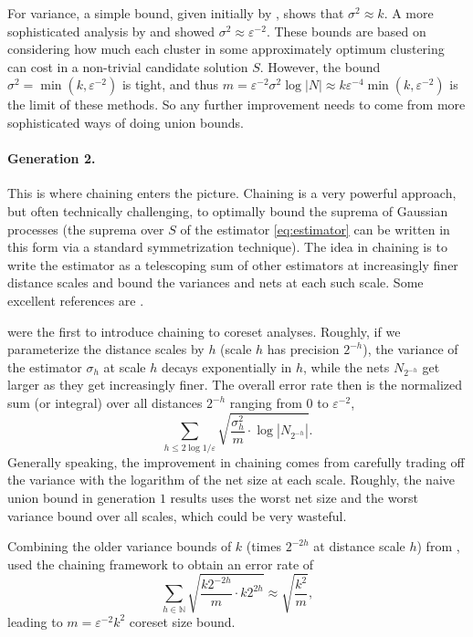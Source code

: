 \documentclass[11pt]{article}
\theoremstyle{restate}
\theoremstyle{definition}
\newcommand{\eps}{\ensuremath{\varepsilon}}
\begin{document}
For variance, a simple bound, given initially by \cite{LS10}, shows that $\sigma^2 \approx k$. A more sophisticated analysis by \cite{FL11} and \cite{CSS21} showed $\sigma^2 \approx \varepsilon^{-2}$. These bounds are based on considering how much each cluster in some approximately optimum clustering can cost in a non-trivial candidate solution $S$.
However, the bound $\sigma^2 = \min(k,\eps^{-2})$ is tight,
and thus $m = \eps^{-2} \sigma^2 \log |N| \approx  k\eps^{-4} \min(k,\eps^{-2})$ is the limit of these methods.
So any further improvement needs to come from more sophisticated ways of doing union bounds.



\paragraph{Generation 2.} This is where chaining enters the picture. Chaining is a very powerful approach, but often technically challenging, to optimally bound the suprema of Gaussian processes (the suprema over $S$ of the estimator \eqref{eq:estimator} can be written in this form via a standard symmetrization technique). The idea in chaining is to write the estimator as a telescoping sum of other estimators at increasingly finer distance scales and bound the variances and nets at each such scale. Some excellent references are \cite{vershynin_2018,talagrand2014upper}.

 \cite{CGSS22} were the first to introduce chaining to coreset analyses. Roughly, if we parameterize the distance scales by $h$ (scale $h$ has precision $2^{-h}$), the variance of the estimator $\sigma_h$ at scale $h$ decays exponentially in $h$, while the nets $N_{2^{-h}}$ get larger as they get increasingly finer. 
 The overall error rate then is the normalized sum (or integral) over all distances $2^{-h}$ ranging from $0$ to $\varepsilon^{-2}$,
  \[\sum_{h \leq 2 \log 1/\eps} \sqrt{\frac{\sigma_h^2}{m} \cdot \log |N_{2^{-h}}|}.\]
  Generally speaking, the improvement in chaining comes from carefully trading off the variance with the logarithm of the net size at each scale. 
Roughly, the naive union bound in generation $1$ results uses the worst net size and the worst variance bound over all scales, which could be very wasteful.

 Combining the older variance bounds of $k$ (times $2^{-2h}$ at distance scale $h$) from \cite{FeldmanSS20,LS10}, \cite{CGSS22} used the chaining framework to obtain an error rate of
 \[\sum_{h\in \mathbb{N}}  \sqrt{\frac{k2^{-2h}}{m}  \cdot k2^{2h}} \approx \sqrt{\frac{k^2}{m}},\]
 leading to $m = \eps^{-2} k^2$ coreset size bound.
\end{document}
